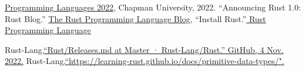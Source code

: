 \documentclass{article}
\theoremstyle{theorem}
\theoremstyle{definition}
\theoremstyle{remark}
\begin{document}
\begin{thebibliography}{99}
 \href{https://github.com/alexhkurz/programming-languages-2022/blob/main/README.md}{Programming Languages 2022}, Chapman University, 2022.
“Announcing Rust 1.0: Rust Blog.” \href{https://blog.rust-lang.org/2015/05/15/Rust-1.0.html}{The Rust Programming Language Blog},
 “Install Rust.”\href{https://github.com/alexhkurz/programming-languages-2022/blob/main/README.md}{ Rust Programming Language }

Rust-Lang.\href{https://github.com/rust-lang/rust/blob/master/RELEASES.md}  {“Rust/Releases.md at Master · Rust-Lang/Rust.” GitHub, 4 Nov. 2022.} 
Rust-Lang.\href{https://learning-rust.github.io/docs/primitive-data-types/}  {“https://learning-rust.github.io/docs/primitive-data-types/".} 
\end{thebibliography}
\end{document}
